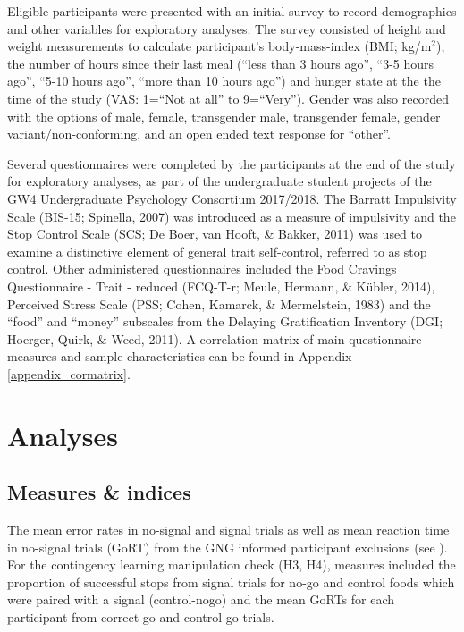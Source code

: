 \documentclass[man,floatsintext]{apa6}
\begin{document}
\par

Eligible participants were presented with an initial survey to record demographics and other variables for exploratory analyses. The survey consisted of height and weight measurements to calculate participant's body-mass-index (BMI; kg/m\(^{2}\)), the number of hours since their last meal (\enquote{less than 3 hours ago}, \enquote{3-5 hours ago}, \enquote{5-10 hours ago}, \enquote{more than 10 hours ago}) and hunger state at the the time of the study (VAS: 1=\enquote{Not at all} to 9=\enquote{Very}). Gender was also recorded with the options of male, female, transgender male, transgender female, gender variant/non-conforming, and an open ended text response for \enquote{other}.

\par

Several questionnaires were completed by the participants at the end of the study for exploratory analyses, as part of the undergraduate student projects of the GW4 Undergraduate Psychology Consortium 2017/2018. The Barratt Impulsivity Scale (BIS-15; Spinella, 2007) was introduced as a measure of impulsivity and the Stop Control Scale (SCS; De Boer, van Hooft, \& Bakker, 2011) was used to examine a distinctive element of general trait self-control, referred to as stop control. Other administered questionnaires included the Food Cravings Questionnaire - Trait - reduced (FCQ-T-r; Meule, Hermann, \& Kübler, 2014), Perceived Stress Scale (PSS; Cohen, Kamarck, \& Mermelstein, 1983) and the \enquote{food} and \enquote{money} subscales from the Delaying Gratification Inventory (DGI; Hoerger, Quirk, \& Weed, 2011). A correlation matrix of main questionnaire measures and sample characteristics can be found in Appendix \ref{appendix_cormatrix}.

\hypertarget{analyses}{%
\section{Analyses}\label{analyses}}

\hypertarget{measures-indices}{%
\subsection{Measures \& indices}\label{measures-indices}}

\par

The mean error rates in no-signal and signal trials as well as mean reaction time in no-signal trials (GoRT) from the GNG informed participant exclusions (see \textit{}). For the contingency learning manipulation check (H3, H4), measures included the proportion of successful stops from signal trials for no-go and control foods which were paired with a signal (control-nogo) and the mean GoRTs for each participant from correct go and control-go trials.
\end{document}
